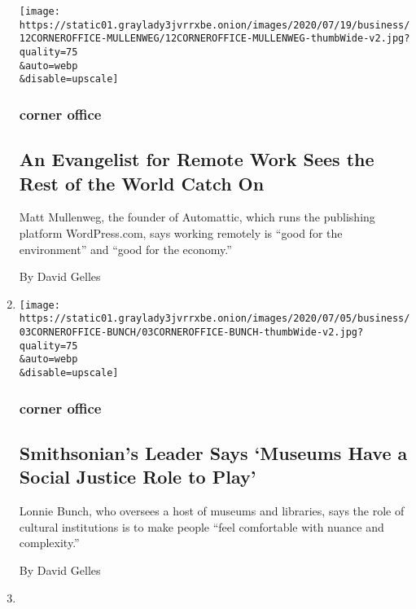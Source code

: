 \begin{enumerate}
  \texttt{[image: https://static01.graylady3jvrrxbe.onion/images/2020/07/19/business/12CORNEROFFICE-MULLENWEG/12CORNEROFFICE-MULLENWEG-thumbWide-v2.jpg?quality=75\\\&auto=webp\\\&disable=upscale]}

  \hypertarget{corner-office-1}{%
  \subsubsection{corner office}\label{corner-office-1}}

  \hypertarget{an-evangelist-for-remote-work-sees-the-rest-of-the-world-catch-on}{%
  \subsection{An Evangelist for Remote Work Sees the Rest of the World
  Catch
  On}\label{an-evangelist-for-remote-work-sees-the-rest-of-the-world-catch-on}}

  Matt Mullenweg, the founder of Automattic, which runs the publishing
  platform WordPress.com, says working remotely is ``good for the
  environment'' and ``good for the economy.''

  By David Gelles
\item
  \href{/2020/07/02/business/smithsonian-lonnie-bunch-corner-office.html}{}

  \texttt{[image: https://static01.graylady3jvrrxbe.onion/images/2020/07/05/business/03CORNEROFFICE-BUNCH/03CORNEROFFICE-BUNCH-thumbWide-v2.jpg?quality=75\\\&auto=webp\\\&disable=upscale]}

  \hypertarget{corner-office-2}{%
  \subsubsection{corner office}\label{corner-office-2}}

  \hypertarget{smithsonians-leader-says-museums-have-a-social-justice-role-to-play}{%
  \subsection{Smithsonian's Leader Says `Museums Have a Social Justice
  Role to
  Play'}\label{smithsonians-leader-says-museums-have-a-social-justice-role-to-play}}

  Lonnie Bunch, who oversees a host of museums and libraries, says the
  role of cultural institutions is to make people ``feel comfortable
  with nuance and complexity.''

  By David Gelles
\item
  \href{/es/2020/06/29/espanol/negocios/pandemia-productividad-teletrabajo.html}{}


\end{enumerate}
